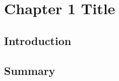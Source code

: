 \documentclass[thesis.tex]{subfiles}
\begin{document}
\chapter{Chapter 1 Title}
\label{cha:cha1}

\section{Introduction}


\section{Summary}


\biblio
\end{document}

